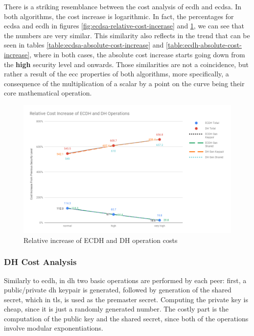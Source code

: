 There is a striking resemblance between the cost analysis of \gls{ecdh} and \gls{ecdsa}. In both algorithms, the cost increase is logarithmic.
In fact, the percentages for \gls{ecdsa} and \gls{ecdh} in figures \ref{fig:ecdsa-relative-cost-incerase}
and \ref{fig:ecdh-dh-relative-cost-increase}, we can see that the numbers are very similar. This similarity also reflects in the
trend that can be seen in tables \ref{table:ecdsa-absolute-cost-increase} and \ref{table:ecdh-absolute-cost-increase}, where in both cases, the
absolute cost increase starts going down from the \textbf{high} security level and onwards. Those similarities are not a coincidence, but rather
a result of the \gls{ecc} properties of both algorithms, more specifically, a consequence of the multiplication of a scalar by a point on
the curve being their core mathematical operation.

  \begin{figure}
    \centering
    \includegraphics[width=1.0\textwidth]{img/ecdh_dh_relative_cost_increase.png}
    \centering \caption{\label{fig:ecdh-dh-relative-cost-increase} Relative increase of ECDH and DH operation costs}
  \end{figure}

\subsubsection{DH Cost Analysis}

Similarly to \gls{ecdh}, in \gls{dh} two basic operations are performed by each peer: first, a public/private \gls{dh} keypair is generated, followed
by generation of the shared secret, which in \gls{tls}, is used as the premaster secret. Computing the private key is cheap, since it is just a randomly
generated number. The costly part is the computation of the public key and the shared secret, since both of the operations involve modular exponentiations.

